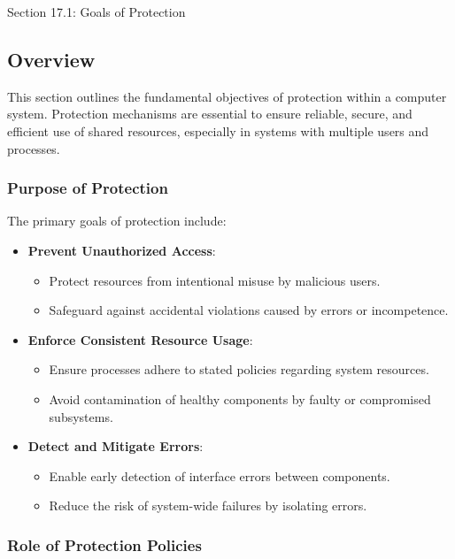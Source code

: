 \begin{notes}{Section 17.1: Goals of Protection}
    \subsection*{Overview}

    This section outlines the fundamental objectives of protection within a computer system. Protection mechanisms are essential to ensure reliable, secure, and efficient use of shared resources, 
    especially in systems with multiple users and processes.
    
    \subsubsection*{Purpose of Protection}
    
    The primary goals of protection include:
    \begin{itemize}
        \item \textbf{Prevent Unauthorized Access}:
        \begin{itemize}
            \item Protect resources from intentional misuse by malicious users.
            \item Safeguard against accidental violations caused by errors or incompetence.
        \end{itemize}
        \item \textbf{Enforce Consistent Resource Usage}:
        \begin{itemize}
            \item Ensure processes adhere to stated policies regarding system resources.
            \item Avoid contamination of healthy components by faulty or compromised subsystems.
        \end{itemize}
        \item \textbf{Detect and Mitigate Errors}:
        \begin{itemize}
            \item Enable early detection of interface errors between components.
            \item Reduce the risk of system-wide failures by isolating errors.
        \end{itemize}
    \end{itemize}
    
    \subsubsection*{Role of Protection Policies}
    

\end{notes}
